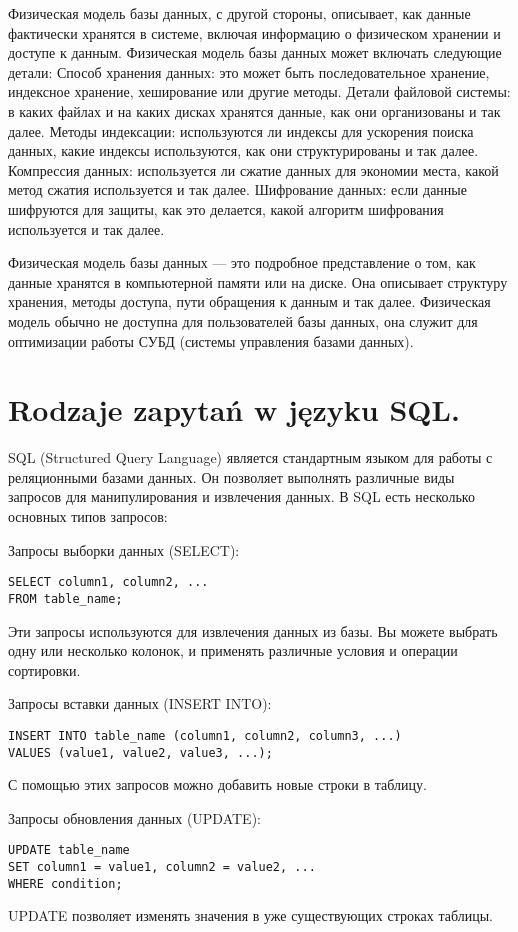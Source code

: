 Физическая модель базы данных, с другой стороны, описывает, как данные фактически хранятся в системе, включая информацию о физическом хранении и доступе к данным.
Физическая модель базы данных может включать следующие детали:
Способ хранения данных: это может быть последовательное хранение, индексное хранение, хеширование или другие методы.
Детали файловой системы: в каких файлах и на каких дисках хранятся данные, как они организованы и так далее.
Методы индексации: используются ли индексы для ускорения поиска данных, какие индексы используются, как они структурированы и так далее.
Компрессия данных: используется ли сжатие данных для экономии места, какой метод сжатия используется и так далее.
Шифрование данных: если данные шифруются для защиты, как это делается, какой алгоритм шифрования используется и так далее.

Физическая модель базы данных — это подробное представление о том, как данные хранятся в компьютерной памяти или на диске. 
Она описывает структуру хранения, методы доступа, пути обращения к данным и так далее. Физическая модель обычно не доступна для пользователей базы данных, 
она служит для оптимизации работы СУБД (системы управления базами данных).

\section{Rodzaje zapytań w języku SQL.}

SQL (Structured Query Language) является стандартным языком для работы с реляционными базами данных. Он позволяет выполнять различные виды запросов для манипулирования и извлечения данных. В SQL есть несколько основных типов запросов:

Запросы выборки данных (SELECT):
\begin{verbatim}
SELECT column1, column2, ...
FROM table_name;
\end{verbatim}
Эти запросы используются для извлечения данных из базы. Вы можете выбрать одну или несколько колонок, и применять различные условия и операции сортировки.

Запросы вставки данных (INSERT INTO):
\begin{verbatim}
INSERT INTO table_name (column1, column2, column3, ...)
VALUES (value1, value2, value3, ...);
\end{verbatim}
С помощью этих запросов можно добавить новые строки в таблицу.

Запросы обновления данных (UPDATE):
\begin{verbatim}
UPDATE table_name
SET column1 = value1, column2 = value2, ...
WHERE condition;
\end{verbatim}
UPDATE позволяет изменять значения в уже существующих строках таблицы.

